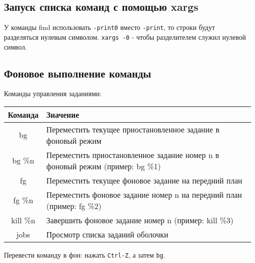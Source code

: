 \subsection{Запуск списка команд с помощью xargs}
У команды find использовать \texttt{-print0} вместо \texttt{-print}, то строки будут разделяться нулевым символом. \texttt{xargs -0} - чтобы разделителем служил нулевой символ.





\subsection{Фоновое выполнение команды}

Команды управления заданиями: \\
\begin{tabular}{|c|p{13cm}|}
\hline
\rowcolor{gray!40}
Команда & Значение \\
\hline
bg & Переместить текущее приостановленное задание в фоновый режим \\
bg \%n & Переместить приостановленное задание номер n в фоновый режим (пример: bg \%1) \\
fg & Переместить текущее фоновое задание на передний план \\
fg \%n & Переместить фоновое задание номер n на передний план (пример: fg \%2) \\
kill \%n & Завершить фоновое задание номер n (пример: kill \%3) \\
jobs & Просмотр списка заданий оболочки \\
\hline
\end{tabular}

Перевести команду в фон: нажать \texttt{Ctrl-Z}, а затем \texttt{bg}.

